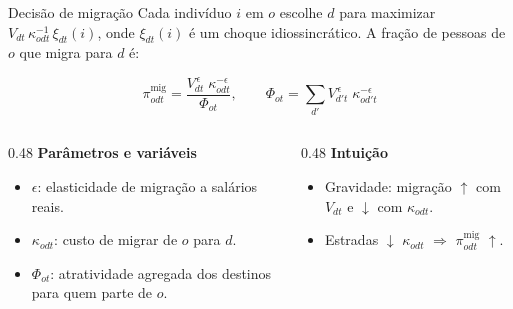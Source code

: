 \begin{frame}{Decisão de migração}
    Cada indivíduo $i$ em $o$ escolhe $d$ para maximizar $V_{dt}\,\kappa_{odt}^{-1}\,\xi_{dt}(i)$,
    onde $\xi_{dt}(i)$ é um choque idiossincrático. A fração de pessoas de $o$ que migra para $d$ é:

    \begin{equation}\label{eq:migration}
        \pi_{odt}^{\text{mig}} = \frac{V_{dt}^{\,\epsilon}\;\kappa_{odt}^{-\epsilon}}{\Phi_{ot}},
        \qquad
        \Phi_{ot} = \sum_{d'} V_{d't}^{\,\epsilon}\;\kappa_{od't}^{-\epsilon}
    \end{equation}

    \vspace{0.4cm}

    \begin{columns}[T]
        \begin{column}{0.48\textwidth}
            \textbf{Parâmetros e variáveis}
            \begin{itemize}\small
                \item $\epsilon$: elasticidade de migração a salários reais.
                \item $\kappa_{odt}$: custo de migrar de $o$ para $d$.
                \item $\Phi_{ot}$: atratividade agregada dos destinos para quem parte de $o$.
            \end{itemize}
        \end{column}
        \begin{column}{0.48\textwidth}
            \textbf{Intuição}
            \begin{itemize}\small
                \item Gravidade: migração $\uparrow$ com $V_{dt}$ e $\downarrow$ com $\kappa_{odt}$.
                \item Estradas $\downarrow$ $\kappa_{odt}$ $\Rightarrow$ $\pi_{odt}^{\text{mig}}$ $\uparrow$.
            \end{itemize}
        \end{column}
    \end{columns}
\end{frame}

